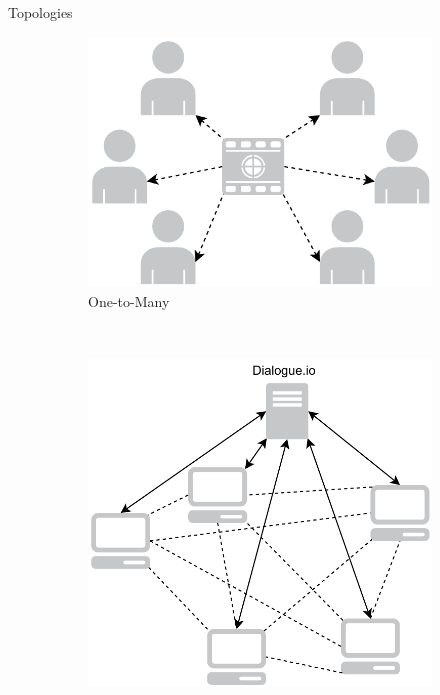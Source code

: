 \documentclass[first=red,second=purple,logo=yellowexc]{aaltoslides}
\begin{document}
\begin{frame}{Topologies}

\begin{figure}[h]
        \centering
        \begin{subfigure}[b]{0.3\textwidth}
                \centering
                \includegraphics[width=\textwidth]{star.pdf}
                \caption{One-to-Many}
        \end{subfigure}%
        ~ %
        \begin{subfigure}[b]{0.3\textwidth}
                \centering
                \includegraphics[width=\textwidth]{mesh.pdf}

\end{subfigure}
\end{figure}
\end{frame}
\end{document}
